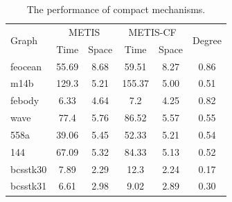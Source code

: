 \documentclass[12pt,glossary]{dalthesis}
\begin{document}
\begin{table}[ht]
\centering
\caption{The performance of compact mechanisms.}
\label{compact-performance}
\begin{tabular}{|l||c|c||c|c||c|}
\cline{2-6}
\hline
\multirow{2}{*}{Graph} & \multicolumn{2}{c||}{METIS} & \multicolumn{2}{c||}{METIS-CF} & \multirow{2}{*}{Degree} \\ \cline{2-5}
                       & Time          & Space        & Time           & Space         &                         \\ \cline{6-6} \hline
feocean                & 55.69         & 8.68         & 59.51          & 8.27          & 0.86                    \\
m14b                   & 129.3         & 5.21         & 155.37         & 5.00          & 0.51                    \\
febody                 & 6.33          & 4.64         & 7.2            & 4.25          & 0.82                    \\
wave                   & 77.4          & 5.76         & 86.52          & 5.57          & 0.55                    \\
558a                   & 39.06         & 5.45         & 52.33          & 5.21          & 0.54                    \\
144                    & 67.09         & 5.32         & 84.33          & 5.13          & 0.52                    \\
bcsstk30               & 7.89          & 2.29         & 12.3           & 2.24          & 0.17                    \\
bcsstk31               & 6.61          & 2.98         & 9.02           & 2.89          & 0.30                    \\ \hline
\end{tabular}
\end{table}
\end{document}
